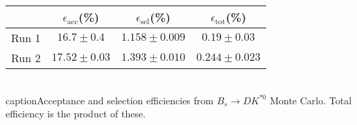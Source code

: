 \begin{table}
    \centering
    \begin{tabular}{cccc}
        \toprule
        & $\epsilon_\mathrm{acc}$(\%) &  $\epsilon_\mathrm{sel}$(\%) &  $\epsilon_\mathrm{tot}$(\%) \\
        \midrule
        Run 1 & $16.7 \pm 0.4$ & $1.158 \pm 0.009$ & $0.19 \pm 0.03$ \\
        Run 2 & $17.52 \pm 0.03$ & $1.393 \pm 0.010$ & $0.244 \pm 0.023$ \\
        \bottomrule
    \end{tabular}
    \\caption{Acceptance and selection efficiencies from  $B_s \to DK^{*0}$ Monte Carlo. Total efficiency is the  product of these.}
\label{tab:selection_efficiency_Bs}
\end{table}
